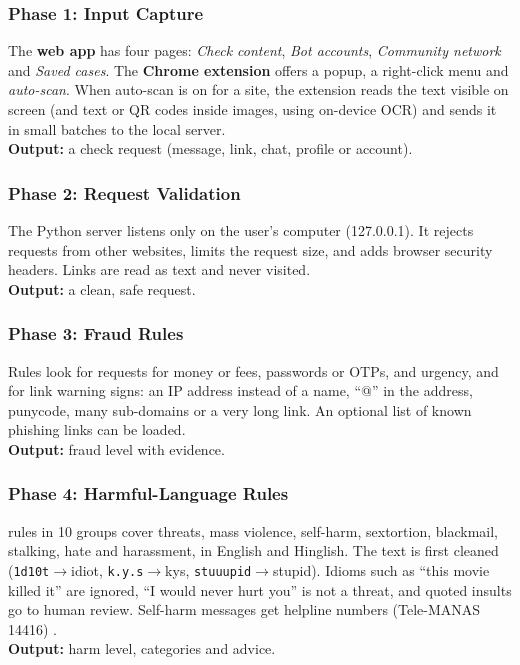 \subsubsection*{Phase 1: Input Capture}
\noindent The \textbf{web app} has four pages: \emph{Check content}, \emph{Bot accounts}, \emph{Community network} and \emph{Saved cases}. The \textbf{Chrome extension} offers a popup, a right-click menu and \emph{auto-scan}. When auto-scan is on for a site, the extension reads the text visible on screen (and text or QR codes inside images, using on-device OCR) and sends it in small batches to the local server.\\
\textbf{Output:} a check request (message, link, chat, profile or account).

\subsubsection*{Phase 2: Request Validation}
\noindent The Python server listens only on the user's computer (127.0.0.1). It rejects requests from other websites, limits the request size, and adds browser security headers. Links are read as text and never visited.\\
\textbf{Output:} a clean, safe request.

\subsubsection*{Phase 3: Fraud Rules}
\noindent Rules look for requests for money or fees, passwords or OTPs, and urgency, and for link warning signs: an IP address instead of a name, ``@'' in the address, punycode, many sub-domains or a very long link. An optional list of known phishing links can be loaded.\\
\textbf{Output:} fraud level with evidence.

\subsubsection*{Phase 4: Harmful-Language Rules}
 rules in 10 groups cover threats, mass violence, self-harm, sextortion, blackmail, stalking, hate and harassment, in English and Hinglish. The text is first cleaned (\texttt{1d10t}$\to$idiot, \texttt{k.y.s}$\to$kys, \texttt{stuuupid}$\to$stupid). Idioms such as ``this movie killed it'' are ignored, ``I would never hurt you'' is not a threat, and quoted insults go to human review. Self-harm messages get helpline numbers (Tele-MANAS 14416) \cite{telemanas}.\\
\textbf{Output:} harm level, categories and advice.

